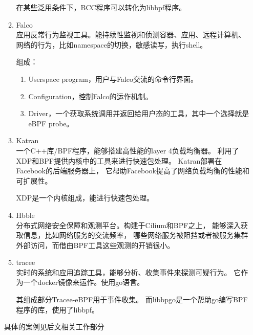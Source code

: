 \documentclass[AutoFakeBold,a4paper]{ctexart}
\begin{document}
\begin{itemize}
\begin{enumerate}
        在某些泛用条件下，BCC程序可以转化为libbpf程序。
        \item Falco\cite{Falco2021}\\
        应用反常行为监视工具。能持续性监视和侦测容器、应用、远程计算机、
        网络的行为，比如namespace的切换，敏感读写，执行shell。

        组成：
        \begin{enumerate}
            \item Userspace program，用户与Falco交流的命令行界面。
            \item Configuration，控制Falco的运作机制。
            \item Driver，一个获取系统调用并返回给用户态的工具，其中一个选择就是eBPF probe。
        \end{enumerate}
        \item Katran\cite{Katran2021}\\
        一个C++库/BPF程序，能够搭建高性能的layer 4负载均衡器。
        利用了XDP和BPF提供内核中的工具来进行快速包处理。
        Katran部署在Facebook的后端服务器上，
        它帮助Facebook提高了网络负载均衡的性能和可扩展性。

        XDP是一个内核组成，能进行快速包处理。
        \item Hbble\cite{Hbble2021}\\
        分布式网络安全保障和观测平台。构建于Cilium和BPF之上，
        能够深入获取信息，比如网络服务的交流频率，
        哪些网络服务被阻挡或者被服务集群外部访问，而借由BPF工具这些观测的开销很小。
        \item tracee\cite{tracee2021}\\
        实时的系统和应用追踪工具，能够分析、收集事件来探测可疑行为。
        它作为一个docker镜像来运作。使用go语言。

        其组成部分Tracee-eBPF用于事件收集。
        而libbpgo是一个帮助go编写BPF程序的库，使用了libbpf。
    \end{enumerate}
    具体的案例见后文相关工作部分

    



\end{itemize}
\end{document}
